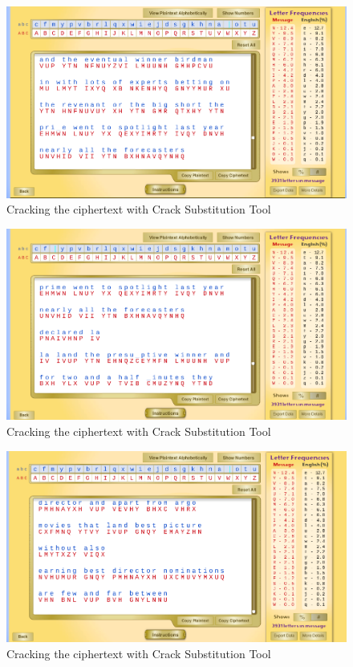 \documentclass[12pt]{article}
\begin{document}
\begin{figure}[!ht]
    \begin{center}
        \includegraphics[scale=0.48]{c18.png}
    \end{center}{}
    \caption{Cracking the ciphertext with Crack Substitution Tool}
    \label{fig:c18}
\end{figure}

\begin{figure}[!ht]
    \begin{center}
        \includegraphics[scale=0.48]{c19.png}
    \end{center}{}
    \caption{Cracking the ciphertext with Crack Substitution Tool}
    \label{fig:c19}
\end{figure}

\begin{figure}[!ht]
    \begin{center}
        \includegraphics[scale=0.48]{c20.png}
    \end{center}{}
    \caption{Cracking the ciphertext with Crack Substitution Tool}
    \label{fig:c20}
\end{figure}
\end{document}
